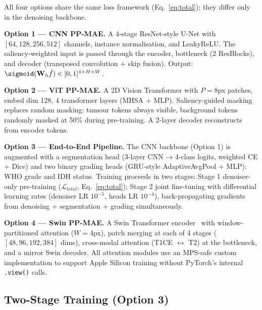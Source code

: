 \documentclass[runningheads]{llncs}
\begin{document}
All four options share the same loss framework (Eq.~\ref{eq:total});
they differ only in the denoising backbone.

\textbf{Option 1 — CNN PP-MAE.}
A 4-stage ResNet-style U-Net with $[\!64, 128, 256, 512\!]$ channels,
instance normalisation, and LeakyReLU. The saliency-weighted input is
passed through the encoder, bottleneck (2 ResBlocks), and decoder
(transposed convolution + skip fusion). Output: $\sigmoid(\mathbf{W}_h \hat{f})
\in [0,1]^{4 \times H \times W}$.

\textbf{Option 2 — ViT PP-MAE.}
A 2D Vision Transformer with $P=8$px patches, embed dim 128,
4 transformer layers (MHSA + MLP). Saliency-guided masking replaces
random masking: tumour tokens always visible, background tokens
randomly masked at 50\% during pre-training. A 2-layer decoder
reconstructs from encoder tokens.

\textbf{Option 3 — End-to-End Pipeline.}
The CNN backbone (Option 1) is augmented with a segmentation head
(3-layer CNN → 4-class logits, weighted CE + Dice)
and two binary grading heads (GRU-style AdaptiveAvgPool + MLP):
WHO grade and IDH status.
Training proceeds in two stages:
Stage 1 denoiser-only pre-training ($\mathcal{L}_{\text{total}}$, Eq.~\ref{eq:total});
Stage 2 joint fine-tuning with differential learning rates
(denoiser LR $10^{-5}$, heads LR $10^{-4}$), back-propagating
gradients from denoising + segmentation + grading simultaneously.

\textbf{Option 4 — Swin PP-MAE.}
A Swin Transformer encoder~\cite{swin} with window-partitioned attention
($W=4$px), patch merging at each of 4 stages
($[\!48, 96, 192, 384\!]$ dims), cross-modal attention (T1CE $\leftrightarrow$ T2)
at the bottleneck, and a mirror Swin decoder.
All attention modules use an MPS-safe custom implementation to support
Apple Silicon training without PyTorch's internal \texttt{.view()} calls.

\subsection{Two-Stage Training (Option 3)}
\label{subsec:twostage}
\end{document}
